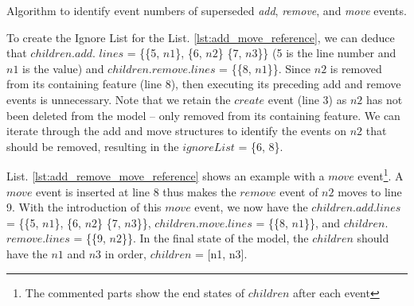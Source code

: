 \documentclass{llncs}
\begin{document}
{\IncMargin{1.4em}
\begin{algorithm}[H]
    \begin{small}
    \end{small}
    \caption{Algorithm to identify event numbers of superseded \emph{add}, \emph{remove}, and \emph{move} events.}
    \label{alg:add_remove_move_optimisation}
\end{algorithm}
\DecMargin{1.4em}

To create the Ignore List for the List. \ref{lst:add_move_reference}, we can deduce that $children$.$add$. $lines$ = \{\{5, $n1$\}, \{6, $n2$\} \{7, $n3$\}\} (5 is the line number and $n1$ is the value) and $children$.$remove$.$lines$ = \{\{8, $n1$\}\}. Since $n2$ is removed from its containing feature (line 8), then executing its preceding add and remove events is unnecessary. Note that we retain the $create$ event (line 3) as $n2$ has not been deleted from the model -- only removed from its containing feature. We can iterate through the add and move structures to identify the events on $n2$ that should be removed, resulting in the $ignoreList$ = \{6, 8\}.

List. \ref{lst:add_remove_move_reference} shows an example with a $move$ event\footnote{The commented parts  show the end states of $children$ after each event}. A $move$ event is inserted at line 8 thus makes the $remove$ event of $n2$  moves to line 9. With the introduction of this $move$ event, we now have the $children$.$add$.$lines$ = \{\{5, $n1$\}, \{6, $n2$\} \{7, $n3$\}\}, $children$.$move$.$lines$ = \{\{8, $n1$\}\}, and $children$.$remove$.$lines$ = \{\{9, $n2$\}\}. In the final state of the model, the $children$ should have the $n1$ and $n3$ in order, $children$ = [n1, n3].  

}
\end{document}
